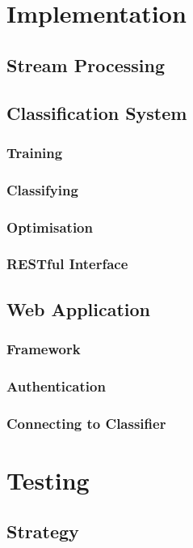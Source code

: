 \documentclass[12pt,a4paper]{article}
\begin{document}
\pagebreak

\section{Implementation}
    \subsection{Stream Processing}
    \subsection{Classification System}
        \subsubsection{Training}
        \subsubsection{Classifying}
        \subsubsection{Optimisation}
        \subsubsection{RESTful Interface}
    \subsection{Web Application}
        \subsubsection{Framework}
        \subsubsection{Authentication}
        \subsubsection{Connecting to Classifier}

\pagebreak

\section{Testing}
    \subsection{Strategy}
\end{document}

